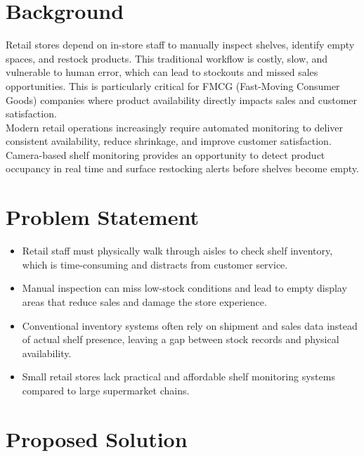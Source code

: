 \section{Background}

Retail stores depend on in-store staff to manually inspect shelves, identify empty spaces, and restock products. This traditional workflow is costly, slow, and vulnerable to human error, which can lead to stockouts and missed sales opportunities. This is particularly critical for FMCG (Fast-Moving Consumer Goods) companies where product availability directly impacts sales and customer satisfaction.
\\
Modern retail operations increasingly require automated monitoring to deliver consistent availability, reduce shrinkage, and improve customer satisfaction. Camera-based shelf monitoring provides an opportunity to detect product occupancy in real time and surface restocking alerts before shelves become empty.

\section{Problem Statement}

\begin{itemize}
    \item Retail staff must physically walk through aisles to check shelf inventory, which is time-consuming and distracts from customer service.
    \item Manual inspection can miss low-stock conditions and lead to empty display areas that reduce sales and damage the store experience.
    \item Conventional inventory systems often rely on shipment and sales data instead of actual shelf presence, leaving a gap between stock records and physical availability.
    \item Small retail stores lack practical and affordable shelf monitoring systems compared to large supermarket chains.
\end{itemize}

\section{Proposed Solution}

